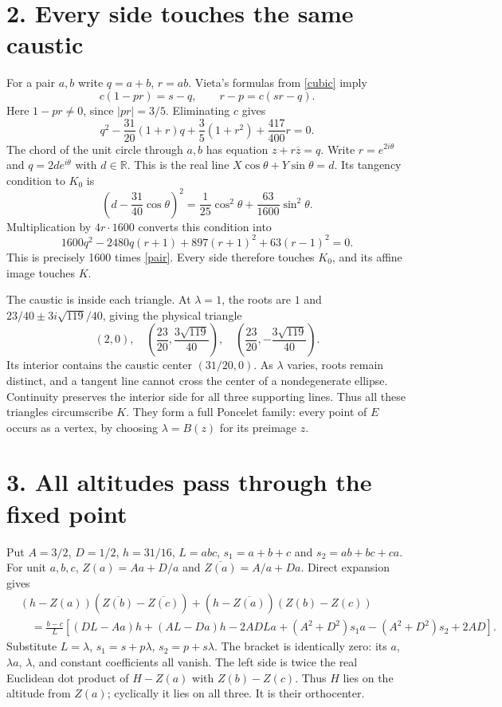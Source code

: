 \documentclass[11pt]{article}
\begin{document}
\section*{2. Every side touches the same caustic}
For a pair $a,b$ write $q=a+b$, $r=ab$.
Vieta's formulas from \eqref{cubic} imply
\[
 c(1-pr)=s-q,\qquad r-p=c(sr-q).
\]
Here $1-pr\ne0$, since $|pr|=3/5$. Eliminating $c$ gives
\begin{equation}\label{pair}
 q^2-\frac{31}{20}(1+r)q+\frac35(1+r^2)
                         +\frac{417}{400}r=0.
\end{equation}
The chord of the unit circle through $a,b$ has equation
$z+r\overline z=q$. Write $r=e^{2i\theta}$ and
$q=2d e^{i\theta}$ with $d\in\mathbb R$. This is the real line
$X\cos\theta+Y\sin\theta=d$.
Its tangency condition to $K_0$ is
\[
 \left(d-\frac{31}{40}\cos\theta\right)^2
       =\frac1{25}\cos^2\theta+\frac{63}{1600}\sin^2\theta.
\]
Multiplication by $4r\cdot1600$ converts this condition into
\[
 1600q^2-2480q(r+1)+897(r+1)^2+63(r-1)^2=0.
\]
This is precisely 1600 times \eqref{pair}.
Every side therefore touches $K_0$, and its affine image touches $K$.

The caustic is inside each triangle. At $\lambda=1$, the roots are
$1$ and $23/40\pm3i\sqrt{119}/40$, giving the physical triangle
\[
 (2,0),\quad
 \left(\frac{23}{20},\frac{3\sqrt{119}}{40}\right),\quad
 \left(\frac{23}{20},-\frac{3\sqrt{119}}{40}\right).
\]
Its interior contains the caustic center $(31/20,0)$. As $\lambda$
varies, roots remain distinct, and a tangent line cannot cross the
center of a nondegenerate ellipse. Continuity preserves the interior
side for all three supporting lines. Thus all these triangles
circumscribe $K$. They form a full Poncelet family: every point of $E$
occurs as a vertex, by choosing $\lambda=B(z)$ for its preimage $z$.

\newpage
\section*{3. All altitudes pass through the fixed point}
Put $A=3/2$, $D=1/2$, $h=31/16$, $L=abc$, $s_1=a+b+c$ and
$s_2=ab+bc+ca$. For unit $a,b,c$,
$Z(a)=Aa+D/a$ and $\overline{Z(a)}=A/a+Da$.
Direct expansion gives
\begin{align*}
 &(h-Z(a))(\overline{Z(b)}-\overline{Z(c)})
 +(h-\overline{Z(a)})(Z(b)-Z(c))\\
 &\quad=\frac{b-c}{L}
 \left[(DL-Aa)h+(AL-Da)h-2ADLa
       +(A^2+D^2)s_1a-(A^2+D^2)s_2+2AD\right].
\end{align*}
Substitute $L=\lambda$, $s_1=s+p\lambda$,
$s_2=p+s\lambda$. The bracket is identically zero:
its $a$, $\lambda a$, $\lambda$, and constant coefficients all vanish.
The left side is twice the real Euclidean dot product of
$H-Z(a)$ with $Z(b)-Z(c)$. Thus $H$ lies on the altitude from $Z(a)$;
cyclically it lies on all three. It is their orthocenter.
\end{document}
